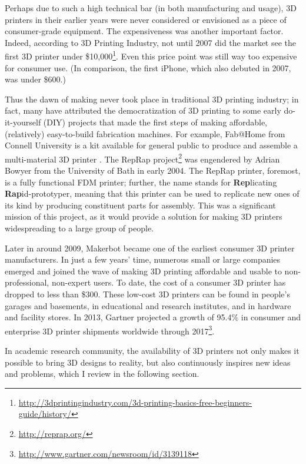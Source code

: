Perhaps due to such a high technical bar (in both manufacturing and usage), 3D printers in their earlier years were never considered or envisioned as a piece of consumer-grade equipment. The expensiveness was another important factor. Indeed, according to 3D Printing Industry, not until 2007 did the market see the first 3D printer under \$10,000\footnote{\url{http://3dprintingindustry.com/3d-printing-basics-free-beginners-guide/history/}}. Even this price point was still way too expensive for consumer use. (In comparison, the first iPhone, which also debuted in 2007, was under \$600.)

Thus the dawn of making never took place in traditional 3D printing industry; in fact, many have attributed the democratization of 3D printing to some early do-it-yourself (DIY) projects that made the first steps of making affordable, (relatively) easy-to-build fabrication machines. For example, Fab@Home from Connell University is a kit available for general public to produce and assemble a multi-material 3D printer \cite{wiki:Fab@Home}. The RepRap project\footnote{\url{http://reprap.org/}} was engendered by Adrian Bowyer from the University of Bath in early 2004. The RepRap printer, foremost, is a fully functional FDM printer; further, the name stands for \textbf{Rep}licating \textbf{Rap}id-prototyper, meaning that this printer can be used to replicate new ones of its kind by producing constituent parts for assembly. This was a significant mission of this project, as it would provide a solution for making 3D printers widespreading to a large group of people.

Later in around 2009, Makerbot became one of the earliest consumer 3D printer manufacturers. In just a few years' time, numerous small or large companies emerged and joined the wave of making 3D printing affordable and usable to non-professional, non-expert users. To date, the cost of a consumer 3D printer has dropped to less than \$300. These low-cost 3D printers can be found in people's garages and basements, in educational and research institutes, and in hardware and facility stores. In 2013, Gartner projected a growth of 95.4\% in consumer and enterprise 3D printer shipments worldwide through 2017\footnote{\url{http://www.gartner.com/newsroom/id/3139118}}.

In academic research community, the availability of 3D printers not only makes it possible to bring 3D designs to reality, but also continuously inspires new ideas and problems, which I review in the following section.

